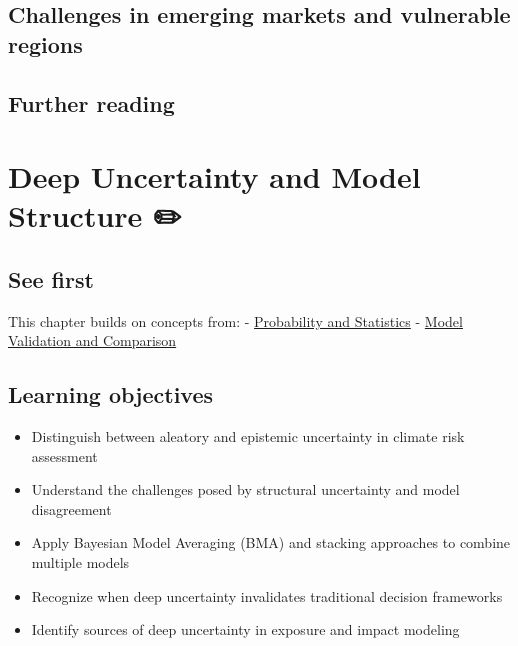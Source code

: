 \documentclass[
  letterpaper,
  DIV=11,
  numbers=noendperiod]{scrreprt}
\providecommand{\tightlist}{%
  \setlength{\itemsep}{0pt}\setlength{\parskip}{0pt}}
\begin{document}
\section{Challenges in emerging markets and vulnerable
regions}\label{challenges-in-emerging-markets-and-vulnerable-regions}

\section*{Further reading}\label{further-reading-16}


\chapter{Deep Uncertainty and Model Structure
✏️}\label{deep-uncertainty-and-model-structure}

\section*{See first}\label{see-first-12}


This chapter builds on concepts from: -
\href{./chapters/fundamentals/probability-stats.qmd}{Probability and
Statistics} - \href{./chapters/fundamentals/model-comparison.qmd}{Model
Validation and Comparison}

\section*{Learning objectives}\label{learning-objectives-17}


\begin{itemize}
\tightlist
\item
  Distinguish between aleatory and epistemic uncertainty in climate risk
  assessment
\item
  Understand the challenges posed by structural uncertainty and model
  disagreement
\item
  Apply Bayesian Model Averaging (BMA) and stacking approaches to
  combine multiple models
\item
  Recognize when deep uncertainty invalidates traditional decision
  frameworks
\item
  Identify sources of deep uncertainty in exposure and impact modeling
\end{itemize}
\end{document}
